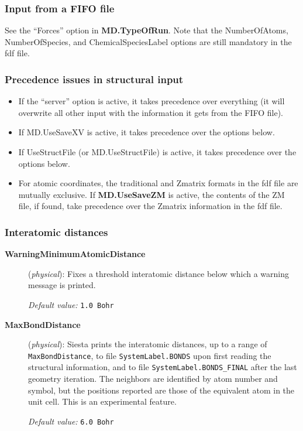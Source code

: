 \documentclass[11pt]{article}
\begin{document}
\subsubsection{Input from a FIFO file}

See the ``Forces'' option in {\bf MD.TypeOfRun}.
Note that the NumberOfAtoms, NumberOfSpecies, and ChemicalSpeciesLabel
options are still mandatory in the fdf file.

\subsubsection{Precedence issues in structural input}

\begin{itemize}
\item If the ``server'' option is active, it takes precedence over
everything (it will overwrite all other input with the information it
gets from the FIFO file).

\item If MD.UseSaveXV is active, it takes precedence over the options below.

\item If UseStructFile (or MD.UseStructFile) is active, it takes precedence
over the options below.

\item For atomic coordinates, the traditional and Zmatrix formats in
  the fdf file are mutually exclusive. If {\bf MD.UseSaveZM} is
  active, the contents of the ZM file, if found, take precedence over
  the Zmatrix information in the fdf file.

\end{itemize}

\subsubsection{Interatomic distances}

\begin{description}
\item[{\bf WarningMinimumAtomicDistance}] ({\it physical}):
Fixes a threshold interatomic distance below which a warning
message is printed.

{\it Default value:} {\tt 1.0 Bohr}

\item[{\bf MaxBondDistance}] ({\it physical}):
{\sc Siesta} prints the interatomic
distances, up to
a range of {\tt MaxBondDistance}, to file
{\tt SystemLabel.BONDS} upon first
reading the structural information, and to file
{\tt SystemLabel.BONDS\_FINAL}
after the last geometry iteration. The neighbors are identified by
atom number and symbol, but the positions reported are those of the
equivalent atom in the unit cell. This is an experimental feature.

{\it Default value:} {\tt 6.0 Bohr}

\end{description}
\end{document}
